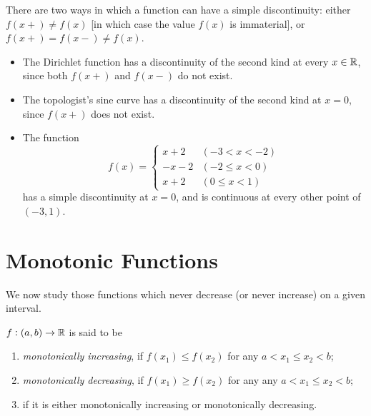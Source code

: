There are two ways in which a function can have a simple discontinuity: either $f(x+)\neq f(x)$ [in which case the value $f(x)$ is immaterial], or $f(x+)=f(x-)\neq f(x)$.

\begin{example}
\begin{itemize}
\item The Dirichlet function has a discontinuity of the second kind at every $x\in\mathbb R$, since both $f(x+)$ and $f(x-)$ do not exist.
\item The topologist's sine curve has a discontinuity of the second kind at $x=0$, since $f(x+)$ does not exist.
\item The function
\[f(x)=\begin{cases}
x+2&(-3<x<-2)\\
-x-2&(-2\le x<0)\\
x+2&(0\le x<1)
\end{cases}\]
has a simple discontinuity at $x=0$, and is continuous at every other point of $(-3,1)$.
\end{itemize}
\end{example}
\pagebreak

\section{Monotonic Functions}
We now study those functions which never decrease (or never increase) on a given interval. 

\begin{definition}[Monotonicity]
$f:(a,b)\to\mathbb R$ is said to be
\begin{enumerate}[label=(\roman*)]
\item \emph{monotonically increasing}, if $f(x_1)\le f(x_2)$ for any $a<x_1\le x_2<b$;
\item \emph{monotonically decreasing}, if $f(x_1)\ge f(x_2)$ for any any $a<x_1\le x_2<b$;
\item {} if it is either monotonically increasing or monotonically decreasing.
\end{enumerate}
\end{definition}

\begin{comment}
\begin{definition}[Convexity]
A function $f$ is \vocab{convex} if for all $x_1,x_2\in D_f$ and $0\le t\le 1$, we have
\[ f(tx_1+(1-t)x_2)\le tf(x_1)+(1-t)f(x_2).\]
$f$ is \emph{strictly convex} if the $\le$ sign above is replaced with a strict inequality $<$.

Similarly, $f$ is \vocab{concave} if for all $x_1,x_2\in D_f$ and $0\le t\le 1$, we have
\[ f(tx_1+(1-t)x_2)\ge tf(x_1)+(1-t)f(x_2). \]
$f$ is \emph{strictly concave} if the $\ge$ sign above is replaced with a strict inequality $>$.
\end{definition}
\end{comment}

